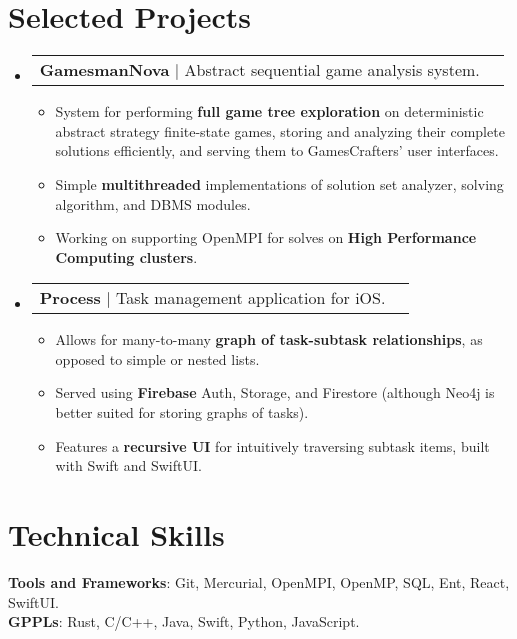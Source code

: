 \documentclass[letterpaper,11pt]{article}
\makeatletter
\newcommand{\resumeItem}[1]{
  \item\small{
    {#1 \vspace{-2pt}}
  }
}
\newcommand{\resumeProjectHeading}[1]{
    \item
    \begin{tabular*}{0.97\textwidth}{l@{\extracolsep{\fill}}r}
      \small#1 \\
    \end{tabular*}\vspace{-7pt}
}
\newcommand{\resumeSubHeadingListStart}{\begin{itemize}[leftmargin=0.15in, label={}]}
\newcommand{\resumeSubHeadingListEnd}{\end{itemize}}
\newcommand{\resumeItemListStart}{\begin{itemize}}
\newcommand{\resumeItemListEnd}{\end{itemize}\vspace{-5pt}}
\makeatother
\begin{document}
\section{Selected Projects}
    \resumeSubHeadingListStart
          \resumeProjectHeading
          {\textbf{GamesmanNova} $|$ Abstract sequential game analysis system.}
          \resumeItemListStart
            \resumeItem{System for performing \textbf{full game tree exploration} on deterministic abstract strategy finite-state games, storing and analyzing their complete solutions efficiently, and serving them to GamesCrafters' user interfaces.}
            \resumeItem{Simple \textbf{multithreaded} implementations of solution set analyzer, solving algorithm, and DBMS modules.}
            \resumeItem{Working on supporting OpenMPI for solves on \textbf{High Performance Computing clusters}.}
          \resumeItemListEnd
      \resumeProjectHeading
          {\textbf{Process} $|$ Task management application for iOS.}
          \resumeItemListStart
            \resumeItem{Allows for many-to-many \textbf{graph of task-subtask relationships}, as opposed to simple or nested lists.}
            \resumeItem{Served using \textbf{Firebase} Auth, Storage, and Firestore (although Neo4j is better suited for storing graphs of tasks).}
            \resumeItem{Features a \textbf{recursive UI} for intuitively traversing subtask items, built with Swift and SwiftUI.}
          \resumeItemListEnd
    \resumeSubHeadingListEnd
%
\section{Technical Skills}
 \begin{itemize}[leftmargin=0.15in, label={}]
    \small{\item{
     \textbf{Tools and Frameworks}{: Git, Mercurial, OpenMPI, OpenMP, SQL, Ent, React, SwiftUI.} \\
     \textbf{GPPLs}{: Rust, C/C++, Java, Swift, Python, JavaScript.} \\
    }}
 \end{itemize}


\end{document}
